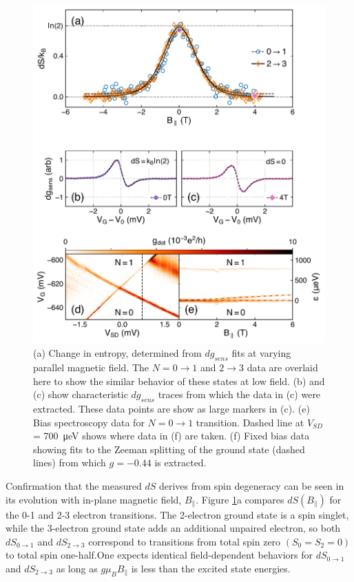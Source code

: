 \documentclass[twocolumn,showpacs,preprintnumbers,amsmath,amssymb,pra,aps,superscriptaddress]{revtex4-1}
\begin{document}
\begin{figure}
        \includegraphics[width=1.0\columnwidth]{../figures/figure_3.pdf}
        \caption{\label{fig:fig3}(a) Change in entropy, determined from $dg_{sens}$ fits at varying parallel magnetic field. The $N=0 \rightarrow 1$ and $2 \rightarrow 3$ data are overlaid here to show the similar behavior of these states at low field. (b) and (c) show characteristic $dg_{sens}$ traces from which the data in (c) were extracted. These data points are show as large markers in (c). (e) Bias spectroscopy data for $N=0 \rightarrow 1$ transition. Dashed line at $V_{SD}$ = \SI{700}{\micro\electronvolt} shows where data in (f) are taken. (f) Fixed bias data showing fits to the Zeeman splitting of the ground state (dashed lines) from which $g = -0.44$ is extracted.}
\end{figure}

Confirmation that the measured $dS$ derives from spin degeneracy can be seen in its evolution with in-plane magnetic field, $B_\parallel$. Figure \ref{fig:fig3}a compares $dS(B_\parallel)$ for the 0-1 and 2-3 electron transitions.  The 2-electron ground state is a spin singlet, while the 3-electron ground state adds an additional unpaired electron, so both $dS_{0 \rightarrow 1}$ and $dS_{2 \rightarrow 3}$ correspond to transitions from total spin zero $(S_0=S_2=0)$ to total spin one-half.One expects identical field-dependent behaviors for $dS_{0\rightarrow 1}$ and $dS_{2\rightarrow 3}$ as long as $g \mu_{B} B_\parallel$ is less than the excited state energies.
\end{document}
